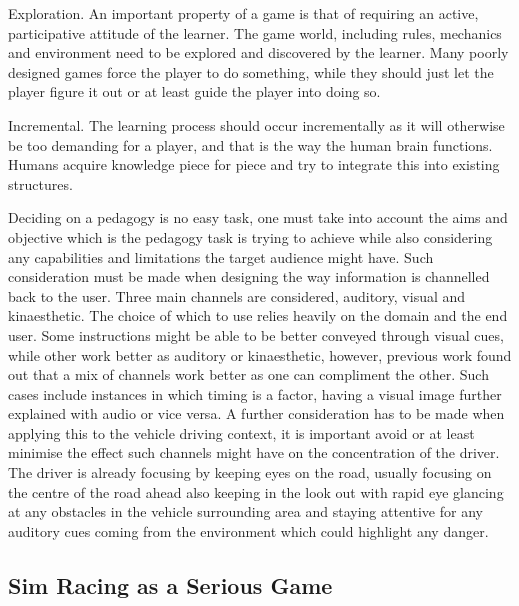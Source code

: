 Exploration. An important property of a game is that of requiring an active, participative attitude of the learner. The game world, including rules, mechanics and environment need to be explored and discovered by the learner. Many poorly designed games force the player to do something, while they should just let the player figure it out or at least guide the player into doing so.

Incremental. The learning process should occur incrementally as it will otherwise be too demanding for a player, and that is the way the human brain functions. Humans acquire knowledge piece for piece and try to integrate this into existing structures\cite{moser2002methodology}.

Deciding on a pedagogy is no easy task, one must take into account the aims and objective which is the pedagogy task is trying to achieve while also considering any capabilities and limitations the target audience might have. Such consideration must be made when designing the way information is channelled back to the user. Three main channels are considered, auditory, visual and kinaesthetic. The choice of which to use relies heavily on the domain and the end user. Some instructions might be able to be better conveyed through visual cues, while other work better as auditory or kinaesthetic, however, previous work found out that a mix of channels work better as one can compliment the other\cite{leahy2003auditory}. Such cases include instances in which timing is a factor, having a visual image further explained with audio or vice versa. A further consideration has to be made when applying this to the vehicle driving context, it is important avoid or at least minimise the effect such channels might have on the concentration of the driver. The driver is already focusing by keeping eyes on the road, usually focusing on the centre of the road ahead also keeping in the look out with rapid eye glancing at any obstacles in the vehicle surrounding area and staying attentive for any auditory cues coming from the environment which could highlight any danger\cite{engstrom2005effects}. 

\subsection{Sim Racing as a Serious Game}

